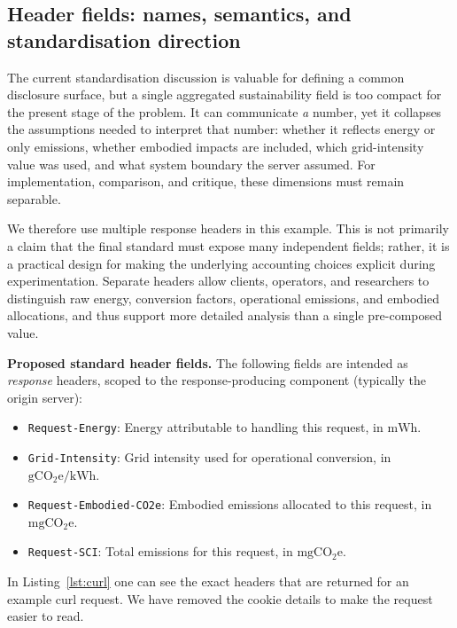 


\subsection{Header fields: names, semantics, and standardisation direction}

The current standardisation discussion is valuable for defining a common disclosure surface, but a single aggregated sustainability field is too compact for the present stage of the problem. It can communicate \emph{a} number, yet it collapses the assumptions needed to interpret that number: whether it reflects energy or only emissions, whether embodied impacts are included, which grid-intensity value was used, and what system boundary the server assumed. For implementation, comparison, and critique, these dimensions must remain separable.

We therefore use multiple response headers in this example. This is not primarily a claim that the final standard must expose many independent fields; rather, it is a practical design for making the underlying accounting choices explicit during experimentation. Separate headers allow clients, operators, and researchers to distinguish raw energy, conversion factors, operational emissions, and embodied allocations, and thus support more detailed analysis than a single pre-composed value.

\textbf{Proposed standard header fields.} The following fields are intended as \emph{response} headers, scoped to the response-producing component (typically the origin server):
\begin{itemize}
  \item \texttt{Request-Energy}: Energy attributable to handling this request, in \(\mathrm{mWh}\).
  \item \texttt{Grid-Intensity}: Grid intensity used for operational conversion, in \(\mathrm{gCO_2e/kWh}\).
  \item \texttt{Request-Embodied-CO2e}: Embodied emissions allocated to this request, in \(\mathrm{mgCO_2e}\).
  \item \texttt{Request-SCI}: Total emissions for this request, in \(\mathrm{mgCO_2e}\).
\end{itemize}

In Listing~\ref{lst:curl} one can see the exact headers that are returned for an example curl request. We have removed the cookie details to make the request easier to read.

